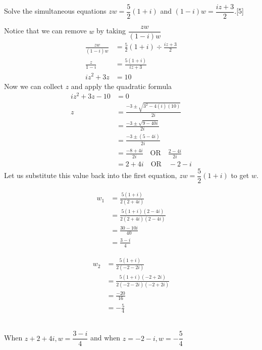 \documentclass[12pt, a4 paper]{article}
\begin{document}
\begin{outline}[enumerate]
	\1 Solve the simultaneous equations $zw=\dfrac{5}{2}(1+i)$ and $(1-i)w=\dfrac{iz+3}{2}$.\hfill[5] %
	\begin{answer}
		Notice that we can remove $w$ by taking $\dfrac{zw}{(1-i)w}$
		\begin{align*}
			\frac{zw}{(1-i)w} & = \frac{5}{2}(1+i) \div \frac{iz+3}{2} \\
			\frac{z}{1-i}     & = \frac{5(1+i)}{iz+3}                  \\
			iz^2+3z           & = 10
		\end{align*}
		Now we can collect $z$ and apply the quadratic formula
		\begin{align*}
			iz^2+3z-10 & = 0                                                      \\
			z          & = \frac{-3\pm\sqrt{3^2-4(i)(10)}}{2i}                    \\
			           & = \frac{-3\pm\sqrt{9-40i}}{2i}                           \\
			           & = \frac{-3\pm(5-4i)}{2i}                                 \\
			           & = \frac{-8+4i}{2i} \quad\textrm{OR}\quad \frac{2-4i}{2i} \\
			           & = 2+4i \quad\textrm{OR}\quad -2-i
		\end{align*}
		Let us substitute this value back into the first equation, $zw=\dfrac{5}{2}(1+i)$ to get $w$.\\
		\noindent
		\begin{minipage}{.3\textwidth}
			\begin{align*}
				w_1 & = \frac{5(1+i)}{2(2+4i)}             \\
				    & = \frac{5(1+i)(2-4i)}{2(2+4i)(2-4i)} \\
				    & = \frac{30-10i}{40}                  \\
				    & = \frac{3-i}{4}
			\end{align*}
		\end{minipage}%
		\begin{minipage}{.5\textwidth}
			\begin{align*}
				w_2 & = \frac{5(1+i)}{2(-2-2i)}               \\
				    & = \frac{5(1+i)(-2+2i)}{2(-2-2i)(-2+2i)} \\
				    & = \frac{-20}{16}                        \\
				    & = -\frac{5}{4}
			\end{align*}
		\end{minipage} \\
		When $z+2+4i, w=\dfrac{3-i}{4}$ and when $z=-2-i, w=-\dfrac{5}{4}$
	\end{answer}


\end{outline}
\end{document}
